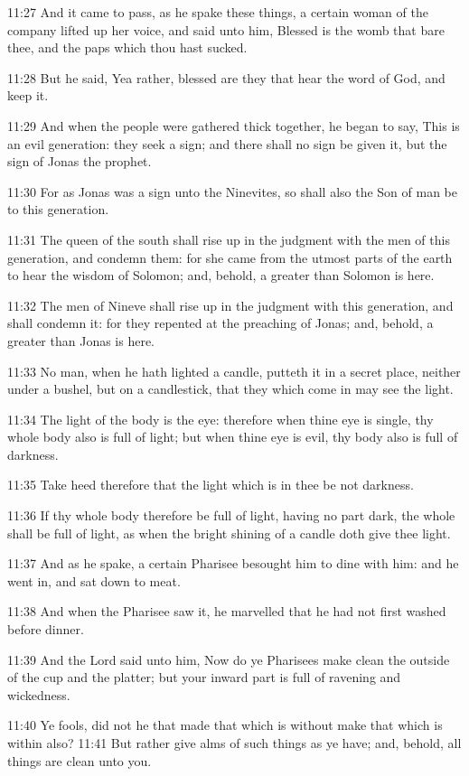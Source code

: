 11:27 And it came to pass, as he spake these things, a certain woman
of the company lifted up her voice, and said unto him, Blessed is the
womb that bare thee, and the paps which thou hast sucked.

11:28 But he said, Yea rather, blessed are they that hear the word of
God, and keep it.

11:29 And when the people were gathered thick together, he began to
say, This is an evil generation: they seek a sign; and there shall no
sign be given it, but the sign of Jonas the prophet.

11:30 For as Jonas was a sign unto the Ninevites, so shall also the
Son of man be to this generation.

11:31 The queen of the south shall rise up in the judgment with the
men of this generation, and condemn them: for she came from the utmost
parts of the earth to hear the wisdom of Solomon; and, behold, a
greater than Solomon is here.

11:32 The men of Nineve shall rise up in the judgment with this
generation, and shall condemn it: for they repented at the preaching
of Jonas; and, behold, a greater than Jonas is here.

11:33 No man, when he hath lighted a candle, putteth it in a secret
place, neither under a bushel, but on a candlestick, that they which
come in may see the light.

11:34 The light of the body is the eye: therefore when thine eye is
single, thy whole body also is full of light; but when thine eye is
evil, thy body also is full of darkness.

11:35 Take heed therefore that the light which is in thee be not
darkness.

11:36 If thy whole body therefore be full of light, having no part
dark, the whole shall be full of light, as when the bright shining of
a candle doth give thee light.

11:37 And as he spake, a certain Pharisee besought him to dine with
him: and he went in, and sat down to meat.

11:38 And when the Pharisee saw it, he marvelled that he had not first
washed before dinner.

11:39 And the Lord said unto him, Now do ye Pharisees make clean the
outside of the cup and the platter; but your inward part is full of
ravening and wickedness.

11:40 Ye fools, did not he that made that which is without make that
which is within also?  11:41 But rather give alms of such things as ye
have; and, behold, all things are clean unto you.

